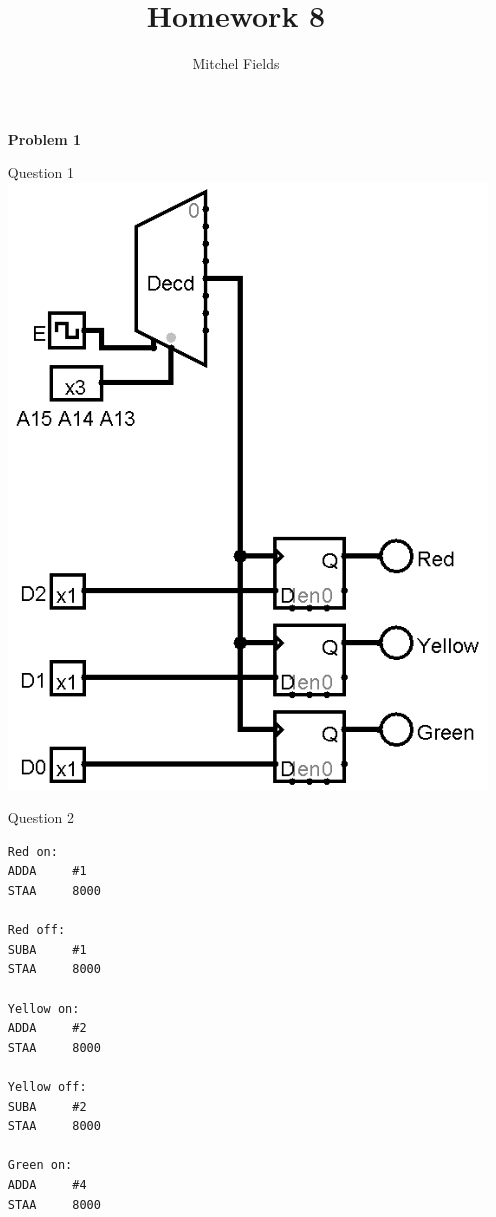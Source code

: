 \documentclass{article}
\title{Homework 8}
\author{Mitchel Fields}
\begin{document}
\maketitle

\begin{itemize}
	\item [\textbf{Problem 1}]
	\item [Question 1]\hspace{0pt}\\
	\includegraphics[scale=0.5]{hw8}
	\item [Question 2]\hspace{0pt}\\
\begin{verbatim}
Red on:
ADDA     #1
STAA     8000

Red off:
SUBA     #1
STAA     8000

Yellow on:
ADDA     #2
STAA     8000

Yellow off:
SUBA     #2
STAA     8000

Green on:
ADDA     #4
STAA     8000


\end{verbatim}
\end{itemize}
\end{document}
